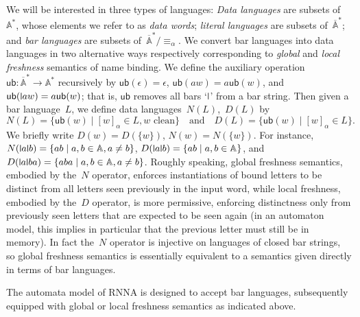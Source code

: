 \documentclass[a4paper,UKenglish,cleveref,thm-restate,numberwithinsect,final]{lipics-v2021}
\newcommand{\Names}{\mathbb{A}}
\newcommand{\barNames}{\overline{\Names}}
\newcommand{\alphaeq}{\equiv_\alpha}
\theoremstyle{plain}
\newcommand{\midmid}{\hspace{0.2ex}{\rule[-0.1ex]{0.6pt}{1.65ex}}\hspace{0.2ex}}
\newcommand{\newletter}[1]{{\midmid}#1}
\newcommand{\ub}{\mathsf{ub}}
\numberwithin{equation}{section}
\newcommand{\+}[1]{\mathcal{#1}\xspace}
\theoremstyle{definition}
\begin{document}
We will be interested in three types of languages: \emph{Data
  languages} are subsets of~$\Names^*$, whose elements we refer to as
\emph{data words}; \emph{literal languages} are subsets
of~$\barNames^*$; and \emph{bar languages} are subsets
of~$\barNames^*/{\alphaeq}$. We convert bar languages into data
languages in two alternative ways respectively corresponding to
\emph{global} and \emph{local freshness} semantics of name binding. We
define the auxiliary operation
$\ub\colon\barNames^*\to\Names^*$ recursively by
$\ub(\epsilon)=\epsilon$, $\ub(aw)=a\ub(w)$, and
$\ub(\newletter aw)=a\ub(w)$; that is, $\ub$ removes all bars
`$\newletter$' from a bar string. Then given a bar language~$L$, we
define data languages~$N(L)$,~$D(L)$ by
\begin{equation*}
  N(L)=\{\ub(w)\mid [w]_\alpha\in L, w\text{ clean}\} \quad\text{and}\quad D(L)=\{\ub(w)\mid[w]_\alpha\in L\}.
\end{equation*}
We briefly write $D(w)=D(\{w\})$, $N(w)=N(\{w\})$. For instance,
$N(\newletter a\newletter b)=\{ab\mid a,b\in\Names, a\neq b\}$,
$D(\newletter a\newletter b)=\{ab\mid a,b\in\Names\}$, and
$D(\newletter a\newletter ba)=\{aba\mid a,b\in\Names,a\neq
b\}$. Roughly speaking, global freshness semantics, embodied by
the~$N$ operator, enforces instantiations of bound letters to be
distinct from all letters seen previously in the input word, while
local freshness, embodied by the~$D$ operator, is more permissive,
enforcing distinctness only from previously seen letters that are
expected to be seen again (in an automaton model, this implies in
particular that the previous letter must still be in memory). In fact
the~$N$ operator is injective on languages of closed bar strings, so
global freshness semantics is essentially equivalent to a semantics
given directly in terms of bar languages.

The automata model of RNNA is designed to accept bar languages,
subsequently equipped with global or local freshness semantics as
indicated above.
\end{document}
